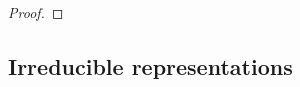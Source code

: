 \documentclass[12pt, a4paper, twoside]{article}
\theoremstyle{definition}
\theoremstyle{remark}
\numberwithin{equation}{section}
\newcommand{\1}{\mathbf{1}}
\newcommand{\0}{\mathbf{0}}
\newcommand{\id}{\text{id}}
\newcommand{\vvec}{\mathbf{v}}
\newcommand{\wvec}{\mathbf{w}}
\begin{document}
\begin{proof}
%		
%		
%		
%		
%		
%		
%		
%		
	\end{proof}
	
\subsection{Irreducible representations}
	
\end{document}

